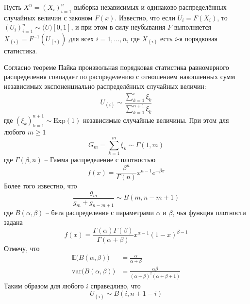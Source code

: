 \documentclass[a4paper]{article}
\newcommand{\ex}[0]{{\mathbb{E}}}
\newcommand{\var}[0]{\text{var}}
\begin{document}
Пусть $X^n = (X_i)_{i=1}^n$ выборка независимых и одинаково распределённых случайных
величин с законом $F(x)$. Известно, что если $U_i = F(X_i)$, то
$(U_i)_{i=1}^n\sim\mathcal(U)[0,1]$, и при этом в силу неубывания $F$ выполняется
$X_{(i)} = F^{-1}(U_{(i)})$ для всех $i=1,\ldots,n$, где $X_{(i)}$ есть $i$-я
порядковая статистика.

Согласно теореме Пайка произвольная порядковая статистика равномерного распределения
совпадает по распределению с отношением накопленных сумм независимых экспоненциально
распределённых случайных величин:
\[U_{(i)}\sim \frac{\sum_{k=1}^i \xi_k}{\sum_{k=1}^{n+1} \xi_k}\]
где $(\xi_k)_{k=1}^{n+1} \sim \text{Exp}(1)$ независимые случайные величины. При
этом для любого $m\geq 1$
\[G_m = \sum_{k=1}^m \xi_k \sim \Gamma(1, m)\]
где $\Gamma(\beta,n)$ -- Гамма распределение с плотностью 
\[f(x) = \frac{\beta^n}{\Gamma(n)} x^{n-1} e^{-\beta x}\]
Более того известно, что 
\[\frac{g_m}{g_m+g_{n-m+1}} \sim B(m, n-m+1)\]
где $B(\alpha,\beta)$ -- бета распределение с параметрами $\alpha$ и $\beta$, чья
функция плотности задана
\[f(x) = \frac{\Gamma(\alpha)\Gamma(\beta)}{\Gamma(\alpha+\beta)} x^{\alpha-1}(1-x)^{\beta-1}\]
Отмечу, что 
\begin{align*}
	\ex\bigl(B(\alpha,\beta)\bigr) &= \frac{\alpha}{\alpha+\beta}\\
	\var\bigl(B(\alpha,\beta)\bigr) &= \frac{\alpha \beta}{(\alpha+\beta)^2(\alpha+\beta+1)}
\end{align*}
Таким образом для любого $i$ справедливо, что
\[U_{(i)} \sim B(i,n+1-i)\]
\end{document}
